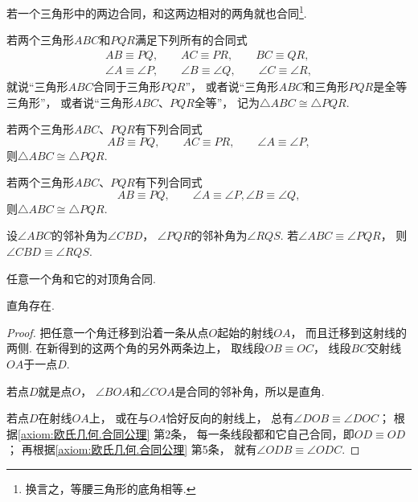 \begin{theorem}\label{theorem:欧氏几何.定理11}
若一个三角形中的两边合同，和这两边相对的两角就也合同\footnote{%
换言之，等腰三角形的底角相等.
}.
\end{theorem}

\begin{definition}
若两个三角形\(ABC\)和\(PQR\)满足下列所有的合同式
\[
\begin{split}
AB \equiv PQ, \qquad
AC \equiv PR, \qquad
BC \equiv QR, \\
\angle A \equiv \angle P, \qquad
\angle B \equiv \angle Q, \qquad
\angle C \equiv \angle R,
\end{split}
\]
就说“三角形\(ABC\)合同于三角形\(PQR\)”，
或者说“三角形\(ABC\)和三角形\(PQR\)是全等三角形”，
或者说“三角形\(ABC\)、\(PQR\)全等”，
记为\(\triangle ABC \cong \triangle PQR\).
\end{definition}

\begin{theorem}[三角形的合同定理1]\label{theorem:欧氏几何.定理12}
若两个三角形\(ABC\)、\(PQR\)有下列合同式
\[
AB \equiv PQ, \qquad
AC \equiv PR, \qquad
\angle A \equiv \angle P,
\]
则\(\triangle ABC \cong \triangle PQR\).
\end{theorem}

\begin{theorem}[三角形的合同定理2]\label{theorem:欧氏几何.定理13}
若两个三角形\(ABC\)、\(PQR\)有下列合同式
\[
AB \equiv PQ, \qquad
\angle A \equiv \angle P,
\angle B \equiv \angle Q,
\]
则\(\triangle ABC \cong \triangle PQR\).
\end{theorem}

\begin{theorem}\label{theorem:欧氏几何.定理14}
设\(\angle ABC\)的邻补角为\(\angle CBD\)，
\(\angle PQR\)的邻补角为\(\angle RQS\).
若\(\angle ABC \equiv \angle PQR\)，
则\(\angle CBD \equiv \angle RQS\).
\end{theorem}

\begin{corollary}\label{theorem:欧氏几何.对顶角合同}
任意一个角和它的对顶角合同.
\end{corollary}

\begin{corollary}\label{theorem:欧氏几何.直角存在}
直角存在.
\begin{proof}
把任意一个角迁移到沿着一条从点\(O\)起始的射线\(OA\)，
而且迁移到这射线的两侧.
在新得到的这两个角的另外两条边上，
取线段\(OB \equiv OC\)，
线段\(BC\)交射线\(OA\)于一点\(D\).

若点\(D\)就是点\(O\)，
\(\angle BOA\)和\(\angle COA\)是合同的邻补角，所以是直角.

若点\(D\)在射线\(OA\)上，
或在与\(OA\)恰好反向的射线上，
总有\(\angle DOB \equiv \angle DOC\)；
根据\cref{axiom:欧氏几何.合同公理} 第2条，
每一条线段都和它自己合同，即\(OD \equiv OD\)；
再根据\cref{axiom:欧氏几何.合同公理} 第5条，
就有\(\angle ODB \equiv \angle ODC\).
\end{proof}
\end{corollary}

